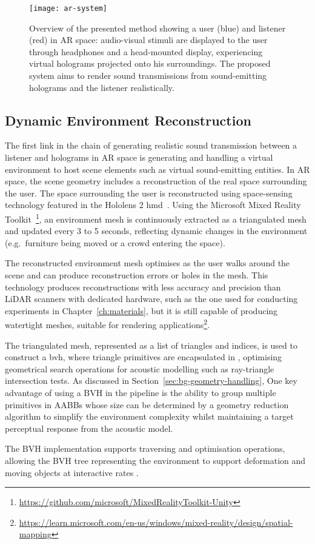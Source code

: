 \begin{figure}[htb]
    \centering
    \texttt{[image: ar-system]}
    \caption[High-level diagram of the proposed sound rendering pipeline]{Overview of the presented method showing a user (blue) and listener (red) in AR space: audio-visual stimuli are displayed to the user through headphones and a head-mounted display, experiencing virtual holograms projected onto his surroundings. The proposed system aims to render sound transmissions from sound-emitting holograms and the listener realistically.}
\label{fig:method-overview}
\end{figure}

\subsection{Dynamic Environment Reconstruction}
The first link in the chain of generating realistic sound transmission between a listener and holograms in AR space is generating and handling a virtual environment to host scene elements such as virtual sound-emitting entities. In AR space, the scene geometry includes a reconstruction of the real space surrounding the user. The space surrounding the user is reconstructed using space-sensing technology featured in the Hololens 2 \acrshort{hmd}~\citep{ungureanu2020hololens}. Using the Microsoft Mixed Reality Toolkit~\footnote{\url{https://github.com/microsoft/MixedRealityToolkit-Unity}}, an environment mesh is continuously extracted as a triangulated mesh and updated every 3 to 5 seconds, reflecting dynamic changes in the environment (e.g.\ furniture being moved or a crowd entering the space).\par
The reconstructed environment mesh optimises as the user walks around the scene and can produce reconstruction errors or holes in the mesh. This technology produces reconstructions with less accuracy and precision than LiDAR scanners with dedicated hardware, such as the one used for conducting experiments in Chapter~\ref{ch:materials}, but it is still capable of producing watertight meshes, suitable for rendering applications\footnote{\url{https://learn.microsoft.com/en-us/windows/mixed-reality/design/spatial-mapping}}.\par  
The triangulated mesh, represented as a list of triangles and indices, is used to construct a \acrfull{bvh}, where triangle primitives are encapsulated in , optimising geometrical search operations for acoustic modelling such as ray-triangle intersection tests. As discussed in Section~\ref{sec:bg-geometry-handling}, One key advantage of using a BVH in the pipeline is the ability to group multiple primitives in AABBs whose size can be determined by a geometry reduction algorithm to simplify the environment complexity whilst maintaining a target perceptual response from the acoustic model.\par
The BVH implementation supports traversing and optimisation operations, allowing the BVH tree representing the environment to support deformation and moving objects at interactive rates \citep{wald2007ray}.

